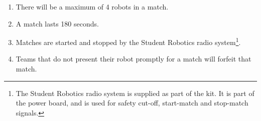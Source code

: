 \begin{enumerate}
\item There will be a maximum of 4 robots in a match.
\item A match lasts 180 seconds.
\item Matches are started and stopped by the Student Robotics radio system\footnote{The Student Robotics radio system is supplied as part of the kit.
 It is part of the power board, and is used for safety cut-off, start-match and stop-match signals.}.
\item Teams that do not present their robot promptly for a match will forfeit that match.
\end{enumerate}
